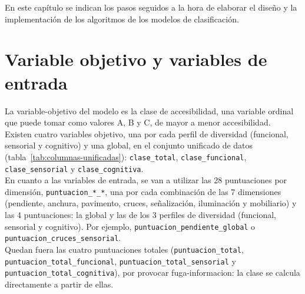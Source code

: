 \label{cap:diseno-implementacion}

En este capítulo se indican los pasos seguidos a la hora de elaborar el diseño y la implementación de los algoritmos de los modelos de clasificación.
\\

\section{Variable objetivo y variables de entrada}
\label{sec:dis-variables}

La \gls{variable-objetivo} del modelo es la clase de accesibilidad, una variable ordinal que puede tomar como valores A, B y C, de mayor a menor accesibilidad.
\\

Existen cuatro variables objetivo, una por cada perfil de diversidad (funcional, sensorial y cognitivo) y una global, en el conjunto unificado de datos (tabla~\ref{tab:columnas-unificadas}): \texttt{clase\_total}, \texttt{clase\_funcional}, \texttt{clase\_sensorial} y \texttt{clase\_cognitiva}.
\\

En cuanto a las variables de entrada, se van a utilizar las 28 puntuaciones por dimensión, \texttt{puntuacion\_*\_*}, una por cada combinación de las 7 dimensiones (pendiente, anchura, pavimento, cruces, señalización, iluminación y mobiliario) y las 4 puntuaciones: la global y las de los 3 perfiles de diversidad (funcional, sensorial y cognitivo). Por ejemplo, \texttt{puntuacion\_pendiente\_global} o \texttt{puntuacion\_cruces\_sensorial}.
\\

Quedan fuera las cuatro puntuaciones totales (\texttt{puntuacion\_\allowbreak total}, \texttt{puntuacion\_\allowbreak total\_\allowbreak funcional}, \texttt{puntuacion\_\allowbreak total\_\allowbreak sensorial} y \texttt{puntuacion\_\allowbreak total\_\allowbreak cognitiva}), por provocar \gls{fuga-informacion}: la clase se calcula directamente a partir de ellas.
\\


